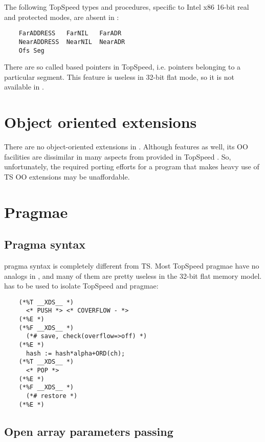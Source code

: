     The following TopSpeed \mt{} types and procedures, specific to
    Intel x86 16-bit real and protected modes, are absent in \xds{}:

    \verb'    FarADDRESS   FarNIL   FarADR' \\
    \verb'    NearADDRESS  NearNIL  NearADR' \\
    \verb'    Ofs Seg'

    There are so called based pointers in TopSpeed, i.e. pointers belonging to
    a particular segment. This feature is useless in 32-bit flat mode, so
    it is not available in \xds{}.

\section{Object oriented extensions}

    There are no object-oriented extensions in \xds{} \mt{}. Although \xds{}
    features \ot{} as well, its OO facilities are dissimilar in many
    aspects from provided in TopSpeed \mt{}. So, unfortunately,
    the required porting efforts for a program that makes heavy use of
    TS OO extensions may be unaffordable.


\section{Pragmae}

\subsection{Pragma syntax}
\label{tscp:pragmae:syntax}

    \xds{} pragma syntax is completely different from TS. Most TopSpeed 
    pragmae have no analogs in \XDS{}, and many of them are pretty useless
    in the 32-bit flat memory model. 
    has to be used to isolate TopSpeed and \XDS{} pragmae:

\begin{verbatim}
    (*%T __XDS__ *)
      <* PUSH *> <* COVERFLOW - *>
    (*%E *)
    (*%F __XDS__ *)
      (*# save, check(overflow=>off) *)
    (*%E *)
      hash := hash*alpha+ORD(ch);
    (*%T __XDS__ *)
      <* POP *>
    (*%E *)
    (*%F __XDS__ *)
      (*# restore *)
    (*%E *)
\end{verbatim}

\subsection{Open array parameters passing}

